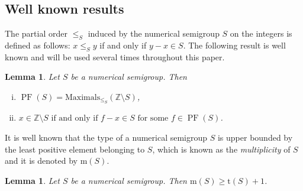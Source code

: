 \documentclass[11pt]{amsart}
\newtheorem{lemma}[theorem]{Lemma}
\theoremstyle{remark}
\begin{document}
\subsection{Well known results}
\label{subsec:general_results}
The partial order $\le_S$ induced by the numerical semigroup $S$ on the integers is defined as follows: $x\le_S y$ if and only if $y-x\in S$.
The following result is well known and will be used several times throughout this paper. 
\begin{lemma}\cite[Lemma~2.19]{NS}\label{lemma:maximals}
Let $S$ be a numerical semigroup. Then
\begin{enumerate}[(i)]
\item $\operatorname{PF}(S)= \mathrm{Maximals}_{\le_S}(\mathbb{Z}\setminus{S})$,
\item $x\in \mathbb{Z}\setminus{S} \mbox{  if and only if } f-x\in S \mbox{ for some } f\in \operatorname{PF}(S)$.
\end{enumerate}
\end{lemma}
It is well known that the type of a numerical semigroup $S$ is upper bounded by the least positive element belonging to $S$, which is known as the \emph{multiplicity} of $S$ and it is denoted by $\mathrm{m}(S)$.
\begin{lemma}\cite[Corollary~2.23]{NS}\label{lemma:type_multiplicity}
	Let $S$ be a numerical semigroup. Then
	$\mathrm{m}(S)\ge \mathrm{t}(S)+1$.
\end{lemma}
\end{document}
